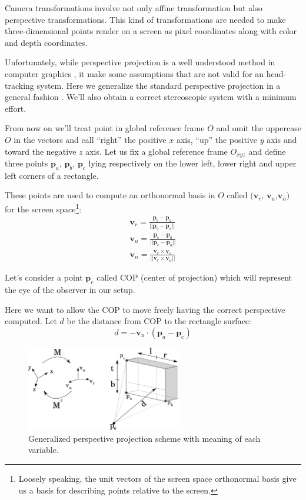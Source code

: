 \documentclass[acmtocl,acmnow]{acmtrans2m}
\begin{document}
Camera transformations involve not only affine transformation but also perspective transformations. This kind of transformations are needed to make three-dimensional points render on a screen as 
pixel coordinates along with color and depth coordinates.

Unfortunately, while perspective projection is a well understood method in computer graphics \cite[Buss]{Buss:2003:CGM:861813}, it make some assumptions that are not valid for an head-tracking system.
Here we generalize the standard perspective projection in a general fashion \cite[Kooima]{kooima}. We'll also obtain a correct stereoscopic system with a minimum effort.

From now on we'll treat point in global reference frame $O$ and omit the uppercase $O$ in the vectors and call ``right'' the positive $x$ axis, ``up'' the positive $y$ axis and toward the negative $z$ axis.
Let us fix a global reference frame $O_{xyz}$ and define three points $\mathbf{p}_{a}$, $\mathbf{p}_b$, $\mathbf{p}_c$ lying respectively on the lower left, lower
right and upper left corners of a rectangle.

These points are used to compute an orthonormal basis in $O$  called $(\mathbf{v}_r$,
$\mathbf{v}_u$,$\mathbf{v}_n)$ for the screen space\footnote{Loosely speaking,
the unit vectors of the screen space orthonormal basis give us a basis for
describing points relative to the screen.}:
\begin{eqnarray}
 \mathbf{v}_r = \frac{\mathbf{p}_b-\mathbf{p}_a}{||\mathbf{p}_b-\mathbf{p}_a||}
\nonumber \\
 \mathbf{v}_u = \frac{\mathbf{p}_c-\mathbf{p}_a}{||\mathbf{p}_c-\mathbf{p}_a||}
\nonumber \\
 \mathbf{v}_n = \frac{\mathbf{v}_r \times \mathbf{v}_u}{||\mathbf{v}_r \times
\mathbf{v}_u||}
\end{eqnarray}

Let's consider a point $\mathbf{p}_e$ called COP (center of projection) which will represent the eye of the observer in our setup.
 
Here we want to allow the COP to move freely having the correct perspective computed. Let $d$ be the distance from COP to the rectangle surface:
\begin{equation}
 d = - \mathbf{v}_n \cdot ( \mathbf{p}_a -\mathbf{p}_e )
\end{equation}

 \begin{figure}[ht]
 \centering
 \includegraphics[width=0.6\textwidth]{genperspectiveprojection2.eps}
 \caption{Generalized perspective projection scheme with meaning of each
variable.}
 \label{fig:perspectiveprojection}
\end{figure}
\end{document}
